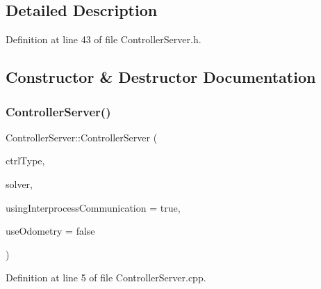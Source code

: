 \subsection{Detailed Description}


Definition at line 43 of file Controller\+Server.\+h.



\subsection{Constructor \& Destructor Documentation}
\hypertarget{classocra__recipes_1_1ControllerServer_a78cc49b2b2a3f9daecc0662051b5644d}{}\label{classocra__recipes_1_1ControllerServer_a78cc49b2b2a3f9daecc0662051b5644d} 
\subsubsection{\texorpdfstring{Controller\+Server()}{ControllerServer()}}
{\footnotesize\ttfamily Controller\+Server\+::\+Controller\+Server (\begin{DoxyParamCaption}\item[{\hyperlink{namespaceocra__recipes_ae561cff4ea9a191b8b1ebb4e69a1a4ba}{C\+O\+N\+T\+R\+O\+L\+L\+E\+R\+\_\+\+T\+Y\+PE}}]{ctrl\+Type,  }\item[{\hyperlink{namespaceocra__recipes_afb3bb4de56c2b9472c80d746eb13fed3}{S\+O\+L\+V\+E\+R\+\_\+\+T\+Y\+PE}}]{solver,  }\item[{bool}]{using\+Interprocess\+Communication = {\ttfamily true},  }\item[{bool}]{use\+Odometry = {\ttfamily false} }\end{DoxyParamCaption})}



Definition at line 5 of file Controller\+Server.\+cpp.

\hypertarget{classocra__recipes_1_1ControllerServer_a02157f0e6432dae6d8ebf3126c335444}{}\label{classocra__recipes_1_1ControllerServer_a02157f0e6432dae6d8ebf3126c335444} 
